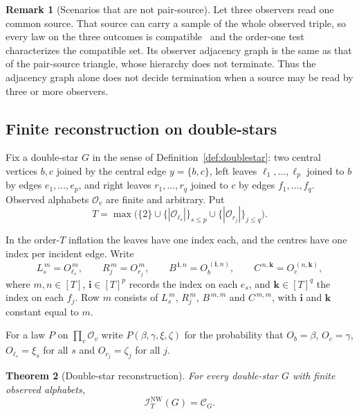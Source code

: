 \documentclass[11pt]{article}
\theoremstyle{plain}
\newtheorem{theorem}{Theorem}[section]
\theoremstyle{definition}
\newtheorem{remark}[theorem]{Remark}
\newcommand{\INW}{\mathcal I^{\mathrm{NW}}}
\begin{document}
\begin{remark}[Scenarios that are not pair-source]\label{rem:hypergraph}
Let three observers read one common source. That source can carry a sample of the whole observed triple, so every law on the three outcomes is compatible~\cite[Proposition 3.7]{Fritz2012} and the order-one test characterizes the compatible set. Its observer adjacency graph is the same as that of the pair-source triangle, whose hierarchy does not terminate. Thus the adjacency graph alone does not decide termination when a source may be read by three or more observers.
\end{remark}

\subsection{Finite reconstruction on double-stars}\label{sec:doublestar}

\providecommand{\Cscen}[1]{\mathcal C_{#1}}
\providecommand{\supp}{\operatorname{supp}}

Fix a double-star $G$ in the sense of Definition~\ref{def:doublestar}: two central vertices $b,c$ joined by the central edge $y=\{b,c\}$, left leaves $\ell_1,\dots,\ell_p$ joined to $b$ by edges $e_1,\dots,e_p$, and right leaves $r_1,\dots,r_q$ joined to $c$ by edges $f_1,\dots,f_q$. Observed alphabets $\mathcal O_v$ are finite and arbitrary. Put
\[
T=\max\bigl(\{2\}\cup\{|\mathcal O_{\ell_s}|\}_{s\le p}\cup\{|\mathcal O_{r_j}|\}_{j\le q}\bigr).
\]

In the order-$T$ inflation the leaves have one index each, and the centres have one index per incident edge. Write
\[
L_s^{\,m}=O_{\ell_s}^{\,m},\qquad R_j^{\,m}=O_{r_j}^{\,m},\qquad
B^{\,\mathbf i,n}=O_b^{\,(\mathbf i,n)},\qquad C^{\,n,\mathbf k}=O_c^{\,(n,\mathbf k)},
\]
where $m,n\in[T]$, $\mathbf i\in[T]^p$ records the index on each $e_s$, and $\mathbf k\in[T]^q$ the index on each $f_j$. Row $m$ consists of $L_s^{\,m}$, $R_j^{\,m}$, $B^{\,m,m}$ and $C^{\,m,m}$, with $\mathbf i$ and $\mathbf k$ constant equal to $m$.

For a law $P$ on $\prod_v\mathcal O_v$ write $P(\beta,\gamma,\xi,\zeta)$ for the probability that $O_b=\beta$, $O_c=\gamma$, $O_{\ell_s}=\xi_s$ for all $s$ and $O_{r_j}=\zeta_j$ for all $j$.

\begin{theorem}[Double-star reconstruction]\label{thm:doublestar}
For every double-star $G$ with finite observed alphabets,
\[
\INW_T(G)=\Cscen{G}.
\]
\end{theorem}
\end{document}
